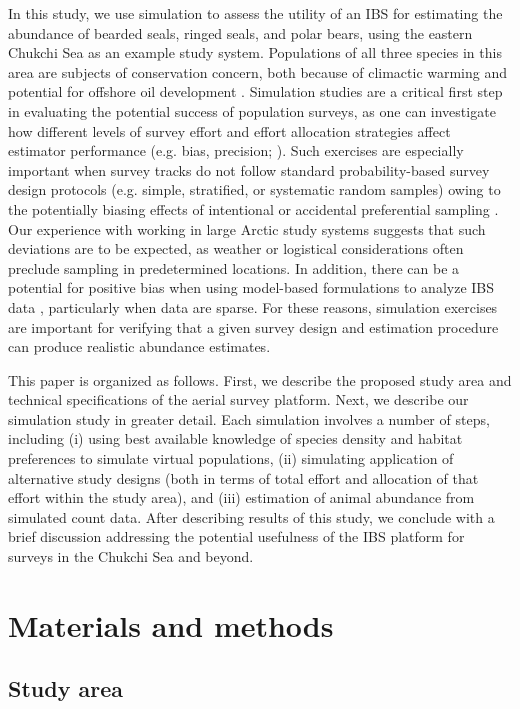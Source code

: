 \documentclass[]{rsos}%
\begin{document}
{In this study, we use simulation to assess the utility of an IBS for estimating the abundance of bearded seals, ringed seals, and polar bears, using the eastern Chukchi Sea as an example study system.  Populations of all three species in this area are subjects of conservation concern, both because of climactic warming and potential for offshore oil development \cite{LaidreEtAl2015,WilsonEtAl2014,USFWS2008}.  Simulation studies are a critical first step in evaluating the potential success of population surveys, as one can investigate how different levels of survey effort and effort allocation strategies affect estimator performance (e.g. bias, precision; \cite{PeelEtAl2015}).  Such exercises are especially important when survey tracks do not follow standard probability-based survey design protocols (e.g. simple, stratified, or systematic random samples) owing to the potentially biasing effects of intentional or accidental preferential sampling \cite{DiggleEtAl2010,PatiEtAl2011}.  Our experience with working in large Arctic study systems suggests that such deviations are to be expected, as weather or logistical considerations often preclude sampling in predetermined locations.  In addition, there can be a potential for positive bias when using model-based formulations to analyze IBS data \cite{ConnEtAl2014}, particularly when data are sparse.  For these reasons, simulation exercises are important for verifying that a given survey design and estimation procedure can produce realistic abundance estimates.

This paper is organized as follows.  First, we describe the proposed study area and technical specifications of the aerial survey platform.  Next, we describe our simulation study in greater detail.  Each simulation involves a number of steps, including (i) using best available knowledge of species density and habitat preferences to simulate virtual populations, (ii) simulating application of alternative study designs (both in terms of total effort and allocation of that effort within the study area), and (iii) estimation of animal abundance from simulated count data.  After describing results of this study, we conclude with a brief discussion addressing the potential usefulness of the IBS platform for surveys in the Chukchi Sea and beyond.

\section{Materials and methods}

\subsection{Study area}

}
\end{document}
